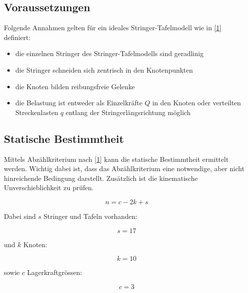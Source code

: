 \documentclass[
  12pt,
  letterpaper,
  DIV=11,
  egregdoesnotlikesansseriftitles]{scrartcl}
\providecommand{\tightlist}{%
  \setlength{\itemsep}{0pt}\setlength{\parskip}{0pt}}\usepackage{longtable,booktabs,array}
\begin{document}
\hypertarget{voraussetzungen}{%
\subsection{Voraussetzungen}\label{voraussetzungen}}

Folgende Annahmen gelten für ein ideales Stringer-Tafelmodell wie in
{[}\protect\hyperlink{ref-Heinzmann2019}{1}{]} definiert:

\begin{itemize}
\tightlist
\item
  die einzelnen Stringer des Stringer-Tafelmodells sind geradlinig
\item
  die Stringer schneiden sich zentrisch in den Knotenpunkten
\item
  die Knoten bilden reibungsfreie Gelenke
\item
  die Belastung ist entweder als Einzelkräfte \(Q\) in den Knoten oder
  verteilten Streckenlasten \(q\) entlang der Stringerlängsrichtung
  möglich
\end{itemize}

\hypertarget{statische-bestimmtheit}{%
\subsection{Statische Bestimmtheit}\label{statische-bestimmtheit}}

Mittels Abzählkriterium nach
{[}\protect\hyperlink{ref-Heinzmann2019}{1}{]} kann die statische
Bestimmtheit ermittelt werden. Wichtig dabei ist, dass das
Abzählkriterium eine notwendige, aber nicht hinreichende Bedingung
darstellt. Zusätzlich ist die kinematische Unverschieblichkeit zu
prüfen.

\begin{equation}n = c - 2 k + s\end{equation}

Dabei sind \(s\) Stringer und Tafeln vorhanden:

\begin{equation}s = 17\end{equation}

und \(k\) Knoten:

\begin{equation}k = 10\end{equation}

sowie \(c\) Lagerkraftgrössen:

\begin{equation}c = 3\end{equation}
\end{document}

